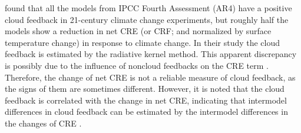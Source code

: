
\cite{Soden2006} found that all the models from IPCC Fourth Assessment (AR4) have a positive cloud feedback in 21-century climate change experiments, but roughly half the models show a reduction in net CRE (or CRF; and normalized by surface temperature change) in response to climate change. In their study the cloud feedback is estimated by the radiative kernel method. This apparent discrepancy is possibly due to the influence of noncloud feedbacks on the CRE term \citep{Zhang1994,Soden2004}. Therefore, the change of net CRE is not a reliable measure of cloud feedback, as the signs of them are sometimes different. However, it is noted that the cloud feedback is correlated with the change in net CRE, indicating that intermodel differences in cloud feedback can be estimated by the intermodel differences in the changes of CRE \citep{Soden2006,Bony2006}. %

